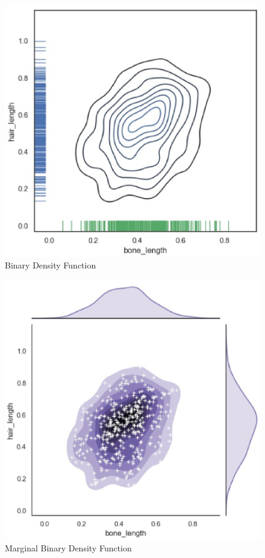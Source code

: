 \begin{figure}[h]\centering
	\includegraphics[scale=0.3]{figures/BDF.eps}
	\caption{Binary Density Function}
\end{figure}

\begin{figure}[h]\centering
	\includegraphics[scale=0.3]{figures/MBDF.eps}
	\caption{Marginal Binary Density Function}
\end{figure}



